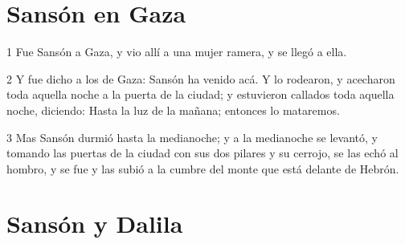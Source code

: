 \section*{Sansón en Gaza}

\par 1 Fue Sansón a Gaza, y vio allí a una mujer ramera, y se llegó a ella.
\par 2 Y fue dicho a los de Gaza: Sansón ha venido acá. Y lo rodearon, y acecharon toda aquella noche a la puerta de la ciudad; y estuvieron callados toda aquella noche, diciendo: Hasta la luz de la mañana; entonces lo mataremos.
\par 3 Mas Sansón durmió hasta la medianoche; y a la medianoche se levantó, y tomando las puertas de la ciudad con sus dos pilares y su cerrojo, se las echó al hombro, y se fue y las subió a la cumbre del monte que está delante de Hebrón.

\section*{Sansón y Dalila}


